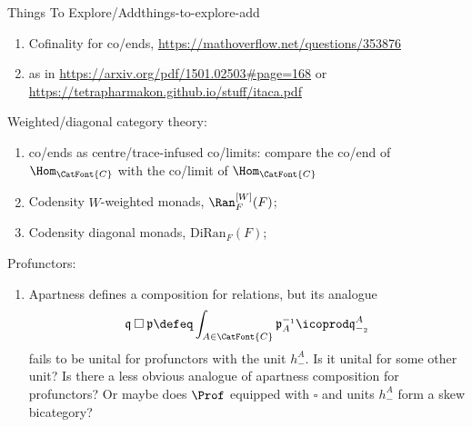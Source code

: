 \begin{remark}{Things To Explore/Add}{things-to-explore-add}
\begin{enumerate}
        \item Cofinality for co/ends, \url{https://mathoverflow.net/questions/353876}
        \item {} as in \url{https://arxiv.org/pdf/1501.02503#page=168} or \url{https://tetrapharmakon.github.io/stuff/itaca.pdf}
    \end{enumerate}
    Weighted/diagonal category theory:
    \begin{enumerate}
        \item co/ends as centre/trace-infused co/limits: compare the co/end of $\Hom_{\CatFont{C}}$ with the co/limit of $\Hom_{\CatFont{C}}$
        \item Codensity $W$-weighted monads, $\Ran^{[W]}_{F}(F)$;
        \item Codensity diagonal monads, $\mathrm{DiRan}_{F}(F)$;
    \end{enumerate}
    Profunctors:
    \begin{enumerate}
        \item Apartness defines a composition for relations, but its analogue
            \[
                \mathfrak{q}\mathbin{\square}\mathfrak{p}%
                \defeq%
                \int_{A\in\CatFont{C}}\mathfrak{p}^{-_{1}}_{A}\icoprod\mathfrak{q}^{A}_{-_{2}}%
            \]%
            fails to be unital for profunctors with the unit $h^{A}_{-}$. Is it unital for some other unit? Is there a less obvious analogue of apartness composition for profunctors? Or maybe does $\Prof$ equipped with $\square$ and units $h^{A}_{-}$ form a skew bicategory?


\end{enumerate}
\end{remark}
